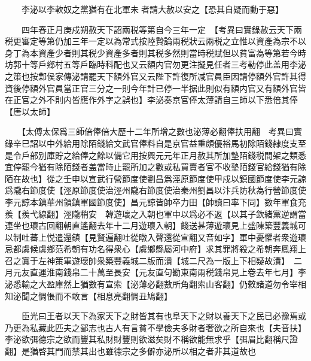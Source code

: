 　　李泌以李軟奴之黨猶有在北軍未者請大赦以安之【恐其自疑而動于惡】

　　四年春正月庚戍朔赦天下詔兩税等第自今三年一定　【考異曰實錄赦云天下兩税更審定等第仍加三年一定以為常式按陸贄論兩税狀云兩税之立惟以資產為宗不以身丁為本資產少者則其税少資產多者則其税多然則當時税賦但以貧富為等第若今時坊郭十等戶鄉村五等戶臨時科配也又云額内官勿更注擬見任者三考勒停此盖用李泌之策也按鄴侯家傳泌請罷天下額外官又云陛下許復所减官員臣因請停額外官許其得資後停額外官員當正官三分之一則今年計已停一半据此則似有額内官又有額外官皆在正官之外不則内皆應作外字之誤也】李泌奏京官俸太薄請自三師以下悉倍其俸【唐以太師】

　　【太傅太保爲三師倍俸倍大歷十二年所增之數也泌薄必翻俸扶用翻　考異曰實錄辛巳詔以中外給用除陌錢給文武官俸料自是京官益重頗優裕馬初除陌錢隸度支至是令戶部别庫貯之給俸之餘以備它用按興元元年正月赦其所加墊陌錢税間架之類悉宜停罷今猶有除陌錢者盖當時止罷所加之數或私買賣者官不收墊陌錢官給錢猶有除陌在故也】從之壬申以宣武行營節度使劉昌爲涇原節度使甲戍以鎮國節度使李元諒爲隴右節度使【涇原節度使治涇州隴右節度使治秦州劉昌以汴兵防秋為行營節度使李元諒本鎮華州領鎮軍國節度使】昌元諒皆帥卒力田【帥讀曰率下同】數年軍食充羨【羨弋線翻】涇隴稍安　韓遊瓌之入朝也軍中以爲必不返【以其子欽緒黨逆謂當連坐也瓌古回翻朝直遙翻去年十二月遊瓌入朝】餞送甚薄遊瓌見上盛陳築豐義城可以制吐蕃上悦遣還鎮【見賢遍翻吐從暾入聲還從宣翻又音如字】軍中憂懼者衆遊瓌忌都虞候虞鄉范希朝有功名得衆心【虞鄉縣屬河中府】求其罪將殺之希朝奔鳳翔上召之寘于左神策軍遊瓌帥衆築豐義城二版而潰【城二尺為一版上下相疑故漬】　二月元友直運淮南錢帛二十萬至長安【元友直句勘東南兩税錢帛見上卷去年七月】李泌悉輸之大盈庫然上猶數有宣索【泌薄必翻數所角翻索山客翻】仍敕諸道勿令宰相知泌聞之惆悵而不敢言【相息亮翻惆丑鳩翻】

　　臣光曰王者以天下為家天下之財皆其有也阜天下之財以養天下之民已必豫焉或乃更為私藏此匹夫之鄙志也古人有言貧不學儉夫多財者奢欲之所自來也【夫音扶】李泌欲弭德宗之欲而豐其私財財豐則欲滋矣財不稱欲能無求乎【弭眉比翻稱尺證翻】是猶啓其門而禁其出也雖德宗之多僻亦泌所以相之者非其道故也

